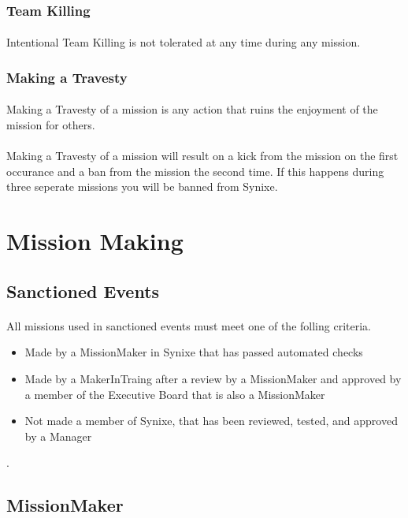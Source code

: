 \documentclass[10pt,a4paper]{article}
\begin{document}
\subsubsection{Team Killing}
\paragraph{}
Intentional Team Killing is not tolerated at any time during any mission.
\subsubsection{Making a Travesty}
\paragraph{}
Making a Travesty of a mission is any action that ruins the enjoyment of the mission for others.
\paragraph{}
Making a Travesty of a mission will result on a kick from the mission on the first occurance and a ban from the mission the second time. If this happens during three seperate missions you will be banned from Synixe.
\section{Mission Making}
\subsection{Sanctioned Events}
\paragraph{}
All missions used in sanctioned events must meet one of the folling criteria.
\begin{itemize}
  \item Made by a MissionMaker in Synixe that has passed automated checks
  \item Made by a MakerInTraing after a review by a MissionMaker and approved by a member of the Executive Board that is also a MissionMaker
  \item Not made a member of Synixe, that has been reviewed, tested, and approved by a Manager
\end{itemize}.
\subsection{MissionMaker}
\end{document}
